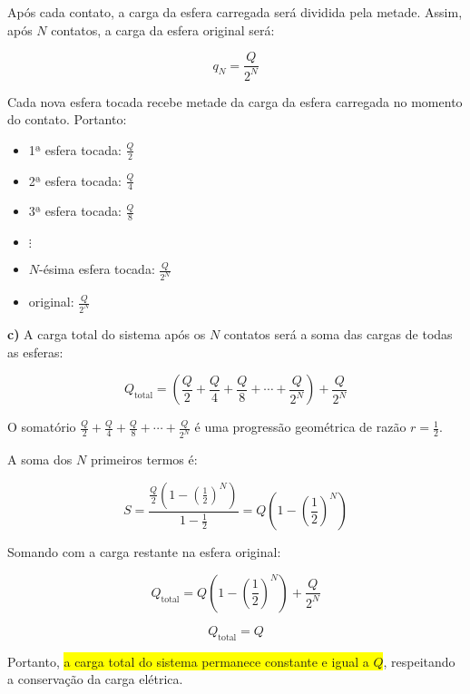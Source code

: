\documentclass[a4paper,12pt]{article}
\begin{document}
Após cada contato, a carga da esfera carregada será dividida pela metade. Assim, após \( N \) contatos, 
a carga da esfera original será:

\begin{equation}
q_N = \frac{Q}{2^N}
\end{equation}

Cada nova esfera tocada recebe metade da carga da esfera carregada no momento do contato. Portanto:
\begin{itemize}
    \item 1ª esfera tocada: \( \frac{Q}{2} \)
    \item 2ª esfera tocada: \( \frac{Q}{4} \)
    \item 3ª esfera tocada: \( \frac{Q}{8} \)
    \item \(\vdots\)
    \item \( N \)-ésima esfera tocada: \( \frac{Q}{2^N} \)
    \item original: \( \frac{Q}{2^N} \)
\end{itemize}

\textbf{c)}
A carga total do sistema após os \( N \) contatos será a soma das cargas de todas as esferas:

\begin{equation}
Q_{\text{total}} = \left( \frac{Q}{2} + \frac{Q}{4} + \frac{Q}{8} + \cdots + \frac{Q}{2^N} \right) + \frac{Q}{2^N}
\end{equation}

O somatório \(\frac{Q}{2} + \frac{Q}{4} + \frac{Q}{8} + \cdots + \frac{Q}{2^N}\) é uma progressão geométrica 
de razão \( r = \frac{1}{2} \).

A soma dos \( N \) primeiros termos é:

\begin{equation}
S = \frac{\frac{Q}{2} \left(1 - \left( \frac{1}{2} \right)^N\right)}{1 - \frac{1}{2}}
= Q\left(1 - \left( \frac{1}{2} \right)^N\right)
\end{equation}

Somando com a carga restante na esfera original:

\begin{equation}
Q_{\text{total}} = Q\left(1 - \left( \frac{1}{2} \right)^N\right) + \frac{Q}{2^N}
\end{equation}

\begin{equation}
Q_{\text{total}} = Q
\end{equation}

Portanto, \colorbox{yellow}{a carga total do sistema permanece constante e igual a \( Q \)}, respeitando a conservação
da carga elétrica.
\end{document}
